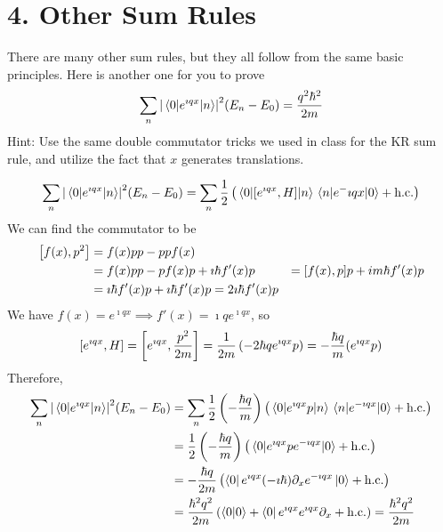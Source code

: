 \documentclass[a4paper,twoside]{article}
\begin{document}
\section*{4. Other Sum Rules}
There are many other sum rules, but they all follow from the same basic principles. Here is another one for you to prove
\begin{equation}
    \sum_n \abs{\mel{0}{e^{\imath qx}}{n}}^2(E_n - E_0) = \frac{q^2 \hbar^2}{2m}
\end{equation}
Hint: Use the same double commutator tricks we used in class for the KR sum rule, and utilize the fact that $ x $ generates translations.
\begin{problem}
    \begin{equation}
        \sum_n \abs{\mel{0}{e^{\imath q x}}{n}}^2 (E_n - E_0) = \sum_n \frac{1}{2} \left( \mel{0}{\comm{e^{\imath q x}}{H}}{n} \mel{n}{e^{-} \imath q x}{0} + \text{h.c.} \right)
    \end{equation}
    We can find the commutator to be
    \begin{align}
        \comm{f(x)}{p^2} &= f(x) pp - pp f(x) \\
        &= f(x) pp - p f(x) p + \imath \hbar f'(x) p
        &= \comm{f(x)}{p} p +im \hbar f'(x) p \\
        &= \imath \hbar f'(x) p + \imath \hbar f'(x) p = 2 \imath \hbar f'(x) p
    \end{align}
    We have $ f(x) = e^{\imath q x} \implies f'(x) = \imath q e^{\imath q x} $, so
    \begin{equation}
        \comm{e^{\imath q x}}{H} = \comm{e^{\imath q x}}{\frac{p^2}{2m}} = \frac{1}{2m} \left( -2 \hbar q e^{\imath q x} p \right) = - \frac{\hbar q}{m} (e^{\imath q x} p)
    \end{equation}
    Therefore,
    \begin{align}
        \sum_n \abs{\mel{0}{e^{\imath q x}}{n}}^2 (E_n - E_0) &= \sum_n \frac{1}{2} \left( - \frac{\hbar q}{m} \right) \left( \mel{0}{e^{\imath q x} p}{n} \mel{n}{e^{- \imath q x}}{0} + \text{h.c.} \right) \\
        &= \frac{1}{2} \left( - \frac{\hbar q}{m} \right) \left( \mel{0}{e^{\imath q x} p e^{- \imath q x}}{0} + \text{h.c.}\right) \\
        &= - \frac{\hbar q}{2m}\left(\bra{0} e^{\imath q x} (- \imath \hbar) \partial_x e^{- \imath q x}\ket{0} + \text{h.c.} \right) \\
        &= \frac{\hbar^2 q^2}{2m} \left(\bra{0}\ket{0} +\bra{0} e^{\imath q x} e^{\imath q x} \partial_x + \text{h.c.} \right) = \frac{\hbar^2 q^2}{2m}
    \end{align}
\end{problem}
\end{document}

